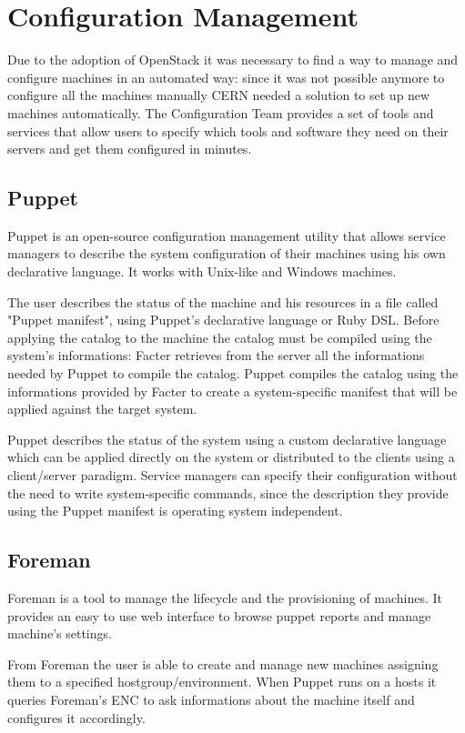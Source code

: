 \section{Configuration Management}

Due to the adoption of OpenStack it was necessary to find a way to manage
and configure machines in an automated way: since it was not possible
anymore to configure all the machines manually CERN needed a solution to
set up new machines automatically. The Configuration Team provides a set
of tools and services that allow users to specify which tools and software
they need on their servers and get them configured in minutes.

\subsection{Puppet}

Puppet is an open-source configuration management utility that allows
service managers to describe the system configuration of their machines
using his own declarative language. It works with Unix-like and Windows
machines.

The user describes the status of the machine and his resources in a file
called "Puppet manifest", using Puppet's declarative language or Ruby DSL.
Before applying the catalog to the machine the catalog must be compiled
using the system's informations: Facter retrieves from the server all the
informations needed by Puppet to compile the catalog. Puppet compiles the
catalog using the informations provided by Facter to create
a system-specific manifest that will be applied against the target system.

Puppet describes the status of the system using a custom declarative
language which can be applied directly on the system or distributed to the
clients using a client/server paradigm. Service managers can specify their
configuration without the need to write system-specific commands, since
the description they provide using the Puppet manifest is operating system
independent.

\subsection{Foreman}

Foreman is a tool to manage the lifecycle and the provisioning of
machines. It provides an easy to use web interface to browse puppet
reports and manage machine's settings.

From Foreman the user is able to create and manage new machines assigning
them to a specified hostgroup/environment. When Puppet runs on a hosts it
queries Foreman's ENC to ask informations about the machine itself and
configures it accordingly.

